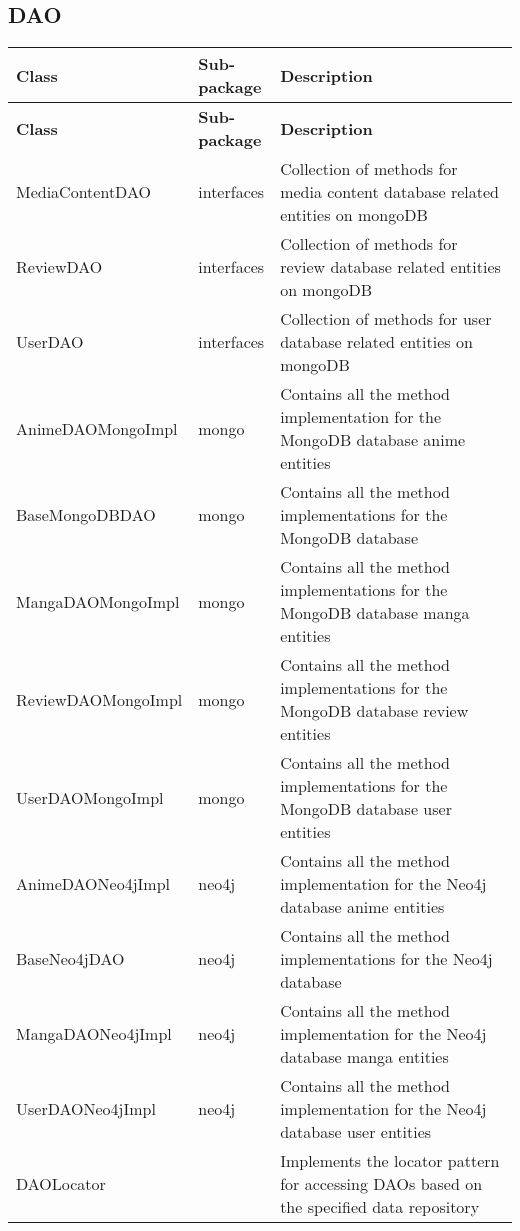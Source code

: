 \subsection*{DAO}
\renewcommand{\arraystretch}{1.5}
\begin{longtable}{|>{\raggedright\arraybackslash}m{0.3\linewidth}|>{\raggedright\arraybackslash}m{0.1\linewidth}|>{\raggedright\arraybackslash}m{0.6\linewidth}|}
    \hline
    \textbf{Class} & \textbf{Sub-package} & \textbf{Description} \\
    \hline
    \endfirsthead

    \hline
    \textbf{Class} & \textbf{Sub-package} & \textbf{Description} \\
    \hline
    \endhead

    \hline
    \endfoot

    \hline
    \endlastfoot

    MediaContentDAO & interfaces & Collection of methods for media content database related entities on mongoDB \\
    \hline
    ReviewDAO & interfaces & Collection of methods for review database related entities on mongoDB \\
    \hline
    UserDAO & interfaces & Collection of methods for user database related entities on mongoDB \\
    \hline
    AnimeDAOMongoImpl & mongo & Contains all the method implementation for the MongoDB database anime entities \\
    \hline      
    BaseMongoDBDAO & mongo & Contains all the method implementations for the MongoDB database \\
    \hline
    MangaDAOMongoImpl & mongo & Contains all the method implementations for the MongoDB database manga entities \\
    \hline
    ReviewDAOMongoImpl & mongo & Contains all the method implementations for the MongoDB database review entities \\
    \hline
    UserDAOMongoImpl & mongo & Contains all the method implementations for the MongoDB database user entities \\
    \hline
    AnimeDAONeo4jImpl & neo4j & Contains all the method implementation for the Neo4j database anime entities \\
    \hline
    BaseNeo4jDAO & neo4j & Contains all the method implementations for the Neo4j database \\
    \hline
    MangaDAONeo4jImpl & neo4j & Contains all the method implementation for the Neo4j database manga entities \\
    \hline
    UserDAONeo4jImpl & neo4j & Contains all the method implementation for the Neo4j database user entities \\
    \hline
    DAOLocator & & Implements the locator pattern for accessing DAOs based on the specified data repository \\
    \hline
\end{longtable}

